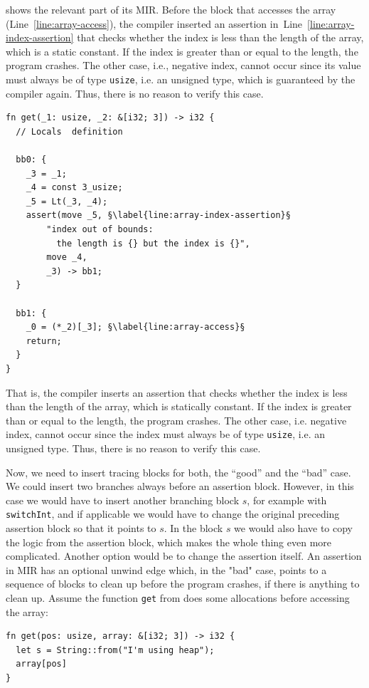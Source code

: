 \documentclass[paper=a4,%
  twoside,%
  BCOR4mm,%
  abstract=true,%
  toc=bibliography,%
  chapterprefix=true,%
  toc=bibliographynumbered,%
  open=right,%
  english,%
  pagesize=pdftex]{scrreprt}
\newcommand{\mir}{\ac{MIR}\xspace}
\begin{document}
 shows the relevant part of its \mir. Before the block that accesses the array (Line~\ref{line:array-access}), the compiler inserted an assertion in~Line~\ref{line:array-index-assertion} that checks whether the index is less than the length of the array, which is a static constant. If the index is greater than or equal to the length, the program crashes. The other case, i.e., negative index, cannot occur since its value must always be of type \texttt{usize}, i.e. an unsigned type, which is guaranteed by the compiler again. Thus, there is no reason to verify this case.

\begin{lstlisting}[language={}, style=boxed, escapechar=§, caption={Compiler inserts runtime assertions at places where arrays are accessed by index}, label=lst:mir-boundary-check]
fn get(_1: usize, _2: &[i32; 3]) -> i32 {
  // Locals  definition

  bb0: {
    _3 = _1;
    _4 = const 3_usize;
    _5 = Lt(_3, _4);
    assert(move _5, §\label{line:array-index-assertion}§
        "index out of bounds:
          the length is {} but the index is {}",
        move _4,
        _3) -> bb1;
  }

  bb1: {
    _0 = (*_2)[_3]; §\label{line:array-access}§
    return;
  }
}
\end{lstlisting}

That is, the compiler inserts an assertion that checks whether the index is less than the length of the array, which is statically constant. If the index is greater than or equal to the length, the program crashes. The other case, i.e. negative index, cannot occur since the index must always be of type \texttt{usize}, i.e. an unsigned type. Thus, there is no reason to verify this case.

Now, we need to insert tracing blocks for both, the ``good'' and the ``bad'' case. We could insert two branches always before an assertion block. However, in this case we would have to insert another branching block $s$, for example with \texttt{switchInt}, and if applicable we would have to change the original preceding assertion block so that it points to $s$. In the block $s$ we would also have to copy the logic from the assertion block, which makes the whole thing even more complicated. Another option would be to change the assertion itself. An assertion in \mir has an optional unwind edge which, in the "bad" case, points to a sequence of blocks to clean up before the program crashes, if there is anything to clean up. Assume the function \texttt{get} from  does some allocations before accessing the array:
\begin{lstlisting}[style=boxed, caption={}]
fn get(pos: usize, array: &[i32; 3]) -> i32 {
  let s = String::from("I'm using heap");
  array[pos]
}
\end{lstlisting}
\end{document}
